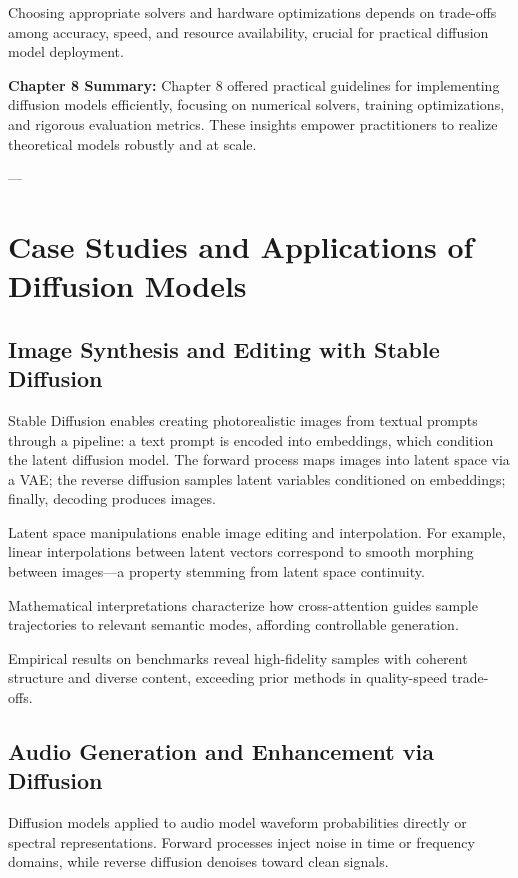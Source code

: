Choosing appropriate solvers and hardware optimizations depends on trade-offs among accuracy, speed, and resource availability, crucial for practical diffusion model deployment.

\textbf{Chapter 8 Summary:}  
Chapter 8 offered practical guidelines for implementing diffusion models efficiently, focusing on numerical solvers, training optimizations, and rigorous evaluation metrics. These insights empower practitioners to realize theoretical models robustly and at scale.

---

\chapter{Case Studies and Applications of Diffusion Models}

\section{Image Synthesis and Editing with Stable Diffusion}

Stable Diffusion enables creating photorealistic images from textual prompts through a pipeline: a text prompt is encoded into embeddings, which condition the latent diffusion model. The forward process maps images into latent space via a VAE; the reverse diffusion samples latent variables conditioned on embeddings; finally, decoding produces images.

Latent space manipulations enable image editing and interpolation. For example, linear interpolations between latent vectors correspond to smooth morphing between images—a property stemming from latent space continuity.

Mathematical interpretations characterize how cross-attention guides sample trajectories to relevant semantic modes, affording controllable generation.

Empirical results on benchmarks reveal high-fidelity samples with coherent structure and diverse content, exceeding prior methods in quality-speed trade-offs.

\section{Audio Generation and Enhancement via Diffusion}

Diffusion models applied to audio model waveform probabilities directly or spectral representations. Forward processes inject noise in time or frequency domains, while reverse diffusion denoises toward clean signals.


